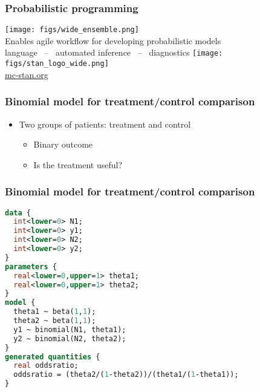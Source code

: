 \documentclass[10pt]{beamer}
\begin{document}
\begin{frame}

  \frametitle{Probabilistic programming}

  \begin{center}
   \vspace{-\baselineskip}
    \texttt{[image: figs/wide\_ensemble.png]}\\
   \vspace{2\baselineskip}
  {\large Enables agile workflow for developing probabilistic models}\\
   \vspace{\baselineskip}
   language \, -- \,
   automated inference \, -- \,
   diagnostics
   \vspace{\baselineskip}
  \vfill
    \texttt{[image: figs/stan\_logo\_wide.png]}\\
    \url{mc-stan.org}
  \end{center}

\end{frame}

\begin{frame}[fragile]
  \frametitle{Binomial model for treatment/control comparison}

  \begin{itemize}
  \item Two groups of patients: treatment and control
    \begin{itemize}
    \item Binary outcome
    \item Is the treatment useful?
    \end{itemize}
  \end{itemize}

\end{frame}

\begin{frame}[fragile]
  \frametitle{Binomial model for treatment/control comparison}
  {\footnotesize
  \begin{lstlisting}[language=Stan]
data {
  int<lower=0> N1;
  int<lower=0> y1;
  int<lower=0> N2;
  int<lower=0> y2;
}
parameters {
  real<lower=0,upper=1> theta1;
  real<lower=0,upper=1> theta2;
}
model {
  theta1 ~ beta(1,1);
  theta2 ~ beta(1,1);
  y1 ~ binomial(N1, theta1);
  y2 ~ binomial(N2, theta2);
}
generated quantities {
  real oddsratio;
  oddsratio = (theta2/(1-theta2))/(theta1/(1-theta1));
}
  \end{lstlisting}
}
\end{frame}
\end{document}
